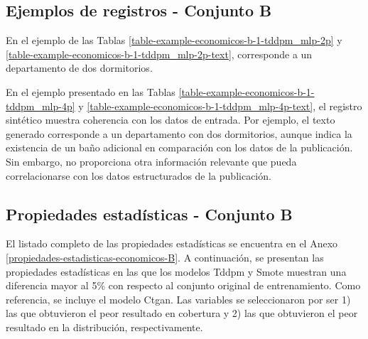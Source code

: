 \subsection{Ejemplos de registros - Conjunto B}
\label{ejemplos-conjunto-b}
En el ejemplo de las Tablas \ref{table-example-economicos-b-1-tddpm_mlp-2p} y \ref{table-example-economicos-b-1-tddpm_mlp-2p-text}, corresponde a un departamento de dos dormitorios.



\newpage
En el ejemplo presentado en las Tablas \ref{table-example-economicos-b-1-tddpm_mlp-4p} y \ref{table-example-economicos-b-1-tddpm_mlp-4p-text}, el registro sintético muestra coherencia con los datos de entrada. Por ejemplo, el texto generado corresponde a un departamento con dos dormitorios, aunque indica la existencia de un baño adicional en comparación con los datos de la publicación. Sin embargo, no proporciona otra información relevante que pueda correlacionarse con los datos estructurados de la publicación.



\newpage
\subsection{Propiedades estadísticas - Conjunto B}
\label{propiedades-conjunto-b}
El listado completo de las propiedades estadísticas se encuentra en el Anexo \ref{propiedades-estadisticas-economicos-B}. A continuación, se presentan las propiedades estadísticas en las que los modelos Tddpm y Smote muestran una diferencia mayor al 5\% con respecto al conjunto original de entrenamiento. Como referencia, se incluye el modelo Ctgan. Las variables se seleccionaron por ser 1) las que obtuvieron el peor resultado en cobertura y 2) las que obtuvieron el peor resultado en la distribución, respectivamente.




